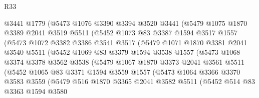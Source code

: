 \begin{lexlean}{R33}
\begin{coremodule}
              @3441
              @1779
              (@5473
                @1076
                @3390
                @3394
                @3520
                @3441
                (@5479
                  @1075
                  @1870
                  @3389
                  @2041
                  @3519
                  @5511
                  (@5452
                    @1073
                    @83
                    @3387
                    @1594
                    @3517
                    @1557
                    (@5473
                      @1072
                      @3382
                      @3386
                      @3541
                      @3517
                      (@5479
                        @1071
                        @1870
                        @3381
                        @2041
                        @3540
                        @5511
                        (@5452
                          @1069
                          @83
                          @3379
                          @1594
                          @3538
                          @1557
                          (@5473
                            @1068
                            @3374
                            @3378
                            @3562
                            @3538
                            (@5479
                              @1067
                              @1870
                              @3373
                              @2041
                              @3561
                              @5511
                              (@5452
                                @1065
                                @83
                                @3371
                                @1594
                                @3559
                                @1557
                                (@5473
                                  @1064
                                  @3366
                                  @3370
                                  @3583
                                  @3559
                                  (@5479
                                    @516
                                    @1870
                                    @3365
                                    @2041
                                    @3582
                                    @5511
                                    (@5452
                                      @514
                                      @83
                                      @3363
                                      @1594
                                      @3580

\end{coremodule}
\end{lexlean}
